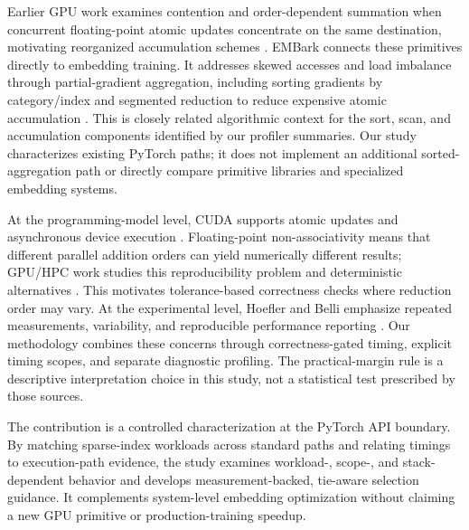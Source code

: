 Earlier GPU work examines contention and order-dependent summation when concurrent floating-point atomic updates concentrate on the same destination, motivating reorganized accumulation schemes \citep{defour2015reproducible}. EMBark connects these primitives directly to embedding training. It addresses skewed accesses and load imbalance through partial-gradient aggregation, including sorting gradients by category/index and segmented reduction to reduce expensive atomic accumulation \citep{liu2024embark}. This is closely related algorithmic context for the sort, scan, and accumulation components identified by our profiler summaries. Our study characterizes existing PyTorch paths; it does not implement an additional sorted-aggregation path or directly compare primitive libraries and specialized embedding systems.

At the programming-model level, CUDA supports atomic updates and asynchronous device execution \citep{nvidia2026cudaguide}. Floating-point non-associativity means that different parallel addition orders can yield numerically different results; GPU/HPC work studies this reproducibility problem and deterministic alternatives \citep{shanmugavelu2024nonassociativity}. This motivates tolerance-based correctness checks where reduction order may vary. At the experimental level, Hoefler and Belli emphasize repeated measurements, variability, and reproducible performance reporting \citep{hoefler2015benchmarking}. Our methodology combines these concerns through correctness-gated timing, explicit timing scopes, and separate diagnostic profiling. The practical-margin rule is a descriptive interpretation choice in this study, not a statistical test prescribed by those sources.

The contribution is a controlled characterization at the PyTorch API boundary. By matching sparse-index workloads across standard paths and relating timings to execution-path evidence, the study examines workload-, scope-, and stack-dependent behavior and develops measurement-backed, tie-aware selection guidance. It complements system-level embedding optimization without claiming a new GPU primitive or production-training speedup.

